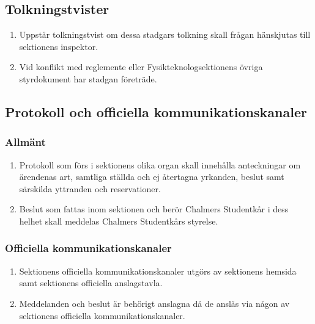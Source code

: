 \documentclass[11pt,a4paper]{article}
\begin{document}
\subsection{Tolkningstvister}
\begin{enumerate}[\thesubsection.1]

  \item Uppstår tolkningstvist om dessa stadgars tolkning skall frågan
  hän\-skju\-tas till sektionens inspektor.
  
  \item Vid konflikt med reglemente eller Fysikteknologsektionens övriga styrdokument har stadgan företräde.

\end{enumerate}



\subsection{Protokoll och officiella kommunikationskanaler}
\subsubsection{Allmänt}
\begin{enumerate}[\thesubsection.1]

  \item Protokoll som förs i sektionens olika organ skall innehålla
  anteckningar om ärendenas art, samtliga ställda och ej återtagna
  yrkanden, beslut samt särskilda yttranden och reservationer.

  \item Beslut som fattas inom sektionen och berör Chalmers Studentkår i dess helhet skall meddelas Chalmers Studentkårs styrelse.

\end{enumerate}

\subsubsection{Officiella kommunikationskanaler}
\begin{enumerate}[\thesubsection.1]

  \item Sektionens officiella kommunikationskanaler utgörs av sektionens hemsida samt sektionens officiella
  anslagstavla.

  \item Meddelanden och beslut är behörigt anslagna då de anslås 
  via någon av sektionens officiella kommunikationskanaler.

\end{enumerate}
\end{document}
